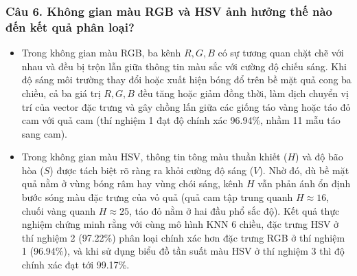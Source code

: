 \documentclass[12pt,a4paper]{article}
\begin{document}
\subsubsection*{Câu 6. Không gian màu RGB và HSV ảnh hưởng thế nào đến kết quả phân loại?}
\begin{itemize}
    \item Trong không gian màu RGB, ba kênh $R, G, B$ có sự tương quan chặt chẽ với nhau và đều bị trộn lẫn giữa thông tin màu sắc với cường độ chiếu sáng. Khi độ sáng môi trường thay đổi hoặc xuất hiện bóng đổ trên bề mặt quả cong ba chiều, cả ba giá trị $R, G, B$ đều tăng hoặc giảm đồng thời, làm dịch chuyển vị trí của vector đặc trưng và gây chồng lấn giữa các giống táo vàng hoặc táo đỏ cam với quả cam (thí nghiệm 1 đạt độ chính xác 96.94\%, nhầm 11 mẫu táo sang cam).
    \item Trong không gian màu HSV, thông tin tông màu thuần khiết ($H$) và độ bão hòa ($S$) được tách biệt rõ ràng ra khỏi cường độ sáng ($V$). Nhờ đó, dù bề mặt quả nằm ở vùng bóng râm hay vùng chói sáng, kênh $H$ vẫn phản ánh ổn định bước sóng màu đặc trưng của vỏ quả (quả cam tập trung quanh $H \approx 16$, chuối vàng quanh $H \approx 25$, táo đỏ nằm ở hai đầu phổ sắc độ). Kết quả thực nghiệm chứng minh rằng với cùng mô hình KNN 6 chiều, đặc trưng HSV ở thí nghiệm 2 (97.22\%) phân loại chính xác hơn đặc trưng RGB ở thí nghiệm 1 (96.94\%), và khi sử dụng biểu đồ tần suất màu HSV ở thí nghiệm 3 thì độ chính xác đạt tới 99.17\%.
\end{itemize}
\end{document}
